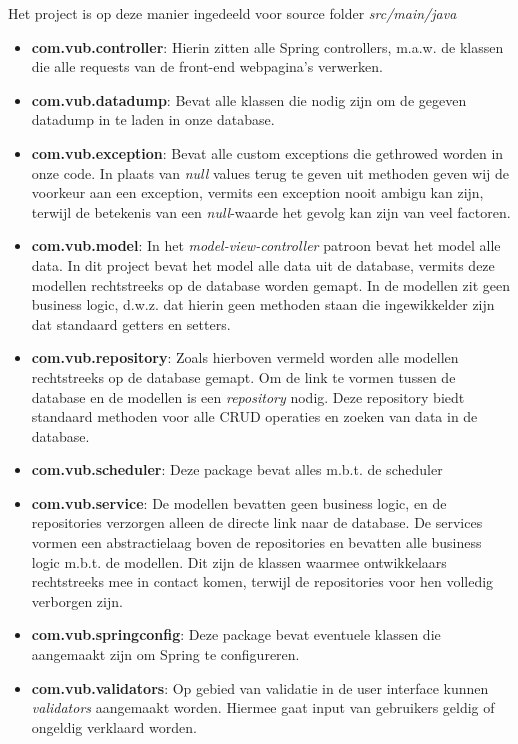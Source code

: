 \noindent
Het project is op deze manier ingedeeld voor source folder \emph{src/main/java}
\begin{itemize}
	\item \textbf{com.vub.controller}: Hierin zitten alle Spring controllers, m.a.w. de klassen die alle requests van de front-end webpagina's verwerken.
	\item \textbf{com.vub.datadump}: Bevat alle klassen die nodig zijn om de gegeven datadump in te laden in onze database.
	\item \textbf{com.vub.exception}: Bevat alle custom exceptions die gethrowed worden in onze code. 
	In plaats van \emph{null} values terug te geven uit methoden geven wij de voorkeur aan een exception, vermits een exception nooit ambigu kan zijn, terwijl de betekenis van een \emph{null}-waarde het gevolg kan zijn van veel factoren.
	\item \textbf{com.vub.model}: In het \emph{model-view-controller} patroon bevat het model alle data.
	In dit project bevat het model alle data uit de database, vermits deze modellen rechtstreeks op de database worden gemapt. 
	In de modellen zit geen business logic, d.w.z. dat hierin geen methoden staan die ingewikkelder zijn dat standaard getters en setters. 
	\item \textbf{com.vub.repository}: Zoals hierboven vermeld worden alle modellen rechtstreeks op de database gemapt.
	Om de link te vormen tussen de database en de modellen is een \emph{repository} nodig.
	Deze repository biedt standaard methoden voor alle CRUD operaties en zoeken van data in de database.
	
	\item \textbf{com.vub.scheduler}: Deze package bevat alles m.b.t. de scheduler
	\item \textbf{com.vub.service}: De modellen bevatten geen business logic, en de repositories verzorgen alleen de directe link naar de database. 
	De services vormen een abstractielaag boven de repositories en bevatten alle business logic m.b.t. de modellen.
	Dit zijn de klassen waarmee ontwikkelaars rechtstreeks mee in contact komen, terwijl de repositories voor hen volledig verborgen zijn.
	\item \textbf{com.vub.springconfig}: Deze package bevat eventuele klassen die aangemaakt zijn om Spring te configureren. 
	\item \textbf{com.vub.validators}: Op gebied van validatie in de user interface kunnen \emph{validators} aangemaakt worden. 
	Hiermee gaat input van gebruikers geldig of ongeldig verklaard worden. 
\end{itemize}
	
